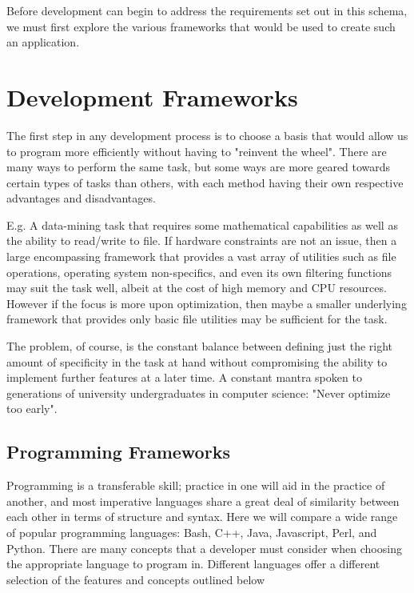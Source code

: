Before development can begin to address the requirements set out in this schema, we must first explore the various frameworks that would be used to create such an application.


\section{Development Frameworks}

The first step in any development process is to choose a basis that would allow us to program more efficiently without having to "reinvent the wheel". There are many ways to perform the same task, but some ways are more geared towards certain types of tasks than others, with each method having their own respective advantages and disadvantages.  

E.g. A data-mining task that requires some mathematical capabilities as well as the ability to read/write to file. If hardware constraints are not an issue, then a large encompassing framework that provides a vast array of utilities such as file operations, operating system non-specifics, and even its own filtering functions may suit the task well, albeit at the cost of high memory and CPU resources. However if the focus is more upon optimization, then maybe a smaller underlying framework that provides only basic file utilities may be sufficient for the task.

The problem, of course, is the constant balance between defining just the right amount of specificity in the task at hand without compromising the ability to implement further features at a later time. A constant mantra spoken to generations of university undergraduates in computer science: "Never optimize too early".


\subsection{Programming Frameworks}

Programming is a transferable skill; practice in one will aid in the practice of another, and most imperative languages share a great deal of similarity between each other in terms of structure and syntax. Here we will compare a wide range of popular programming languages: Bash, C++, Java, Javascript, Perl, and Python. There are many concepts that a developer must consider when choosing the appropriate language to program in. Different languages offer a different selection of the features and concepts outlined below

